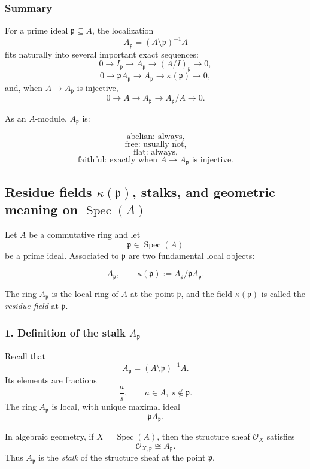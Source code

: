 \documentclass[12pt,a4paper]{article}
\theoremstyle{notespace}
\newcommand{\Spec}{\operatorname{Spec}}
\theoremstyle{definition}
\begin{document}
\subsubsection{Summary}

For a prime ideal \(\mathfrak p\subseteq A\), the localization
\[
A_{\mathfrak p}=(A\setminus \mathfrak p)^{-1}A
\]
fits naturally into several important exact sequences:
\[
0
\longrightarrow
I_{\mathfrak p}
\longrightarrow
A_{\mathfrak p}
\longrightarrow
(A/I)_{\mathfrak p}
\longrightarrow
0,
\]
\[
0
\longrightarrow
\mathfrak p A_{\mathfrak p}
\longrightarrow
A_{\mathfrak p}
\longrightarrow
\kappa(\mathfrak p)
\longrightarrow
0,
\]
and, when \(A\to A_{\mathfrak p}\) is injective,
\[
0
\longrightarrow
A
\longrightarrow
A_{\mathfrak p}
\longrightarrow
A_{\mathfrak p}/A
\longrightarrow
0.
\]

As an \(A\)-module, \(A_{\mathfrak p}\) is:

\[
\text{abelian: always,}
\]
\[
\text{free: usually not,}
\]
\[
\text{flat: always,}
\]
\[
\text{faithful: exactly when } A\to A_{\mathfrak p} \text{ is injective.}
\]

\subsection{Residue fields \(\kappa(\mathfrak p)\), stalks, and geometric meaning on \(\Spec(A)\)}

Let \(A\) be a commutative ring and let
\[
\mathfrak p\in \Spec(A)
\]
be a prime ideal. Associated to \(\mathfrak p\) are two fundamental local objects:

\[
A_{\mathfrak p},
\qquad
\kappa(\mathfrak p):=A_{\mathfrak p}/\mathfrak p A_{\mathfrak p}.
\]

The ring \(A_{\mathfrak p}\) is the local ring of \(A\) at the point \(\mathfrak p\), and the field \(\kappa(\mathfrak p)\) is called the \emph{residue field} at \(\mathfrak p\).

\subsubsection{1. Definition of the stalk \(A_{\mathfrak p}\)}

Recall that
\[
A_{\mathfrak p}=(A\setminus \mathfrak p)^{-1}A.
\]
Its elements are fractions
\[
\frac{a}{s},
\qquad
a\in A,\ s\notin \mathfrak p.
\]
The ring \(A_{\mathfrak p}\) is local, with unique maximal ideal
\[
\mathfrak p A_{\mathfrak p}.
\]

In algebraic geometry, if \(X=\Spec(A)\), then the structure sheaf \(\mathcal O_X\) satisfies
\[
\mathcal O_{X,\mathfrak p}\cong A_{\mathfrak p}.
\]
Thus \(A_{\mathfrak p}\) is the \emph{stalk} of the structure sheaf at the point \(\mathfrak p\).
\end{document}

